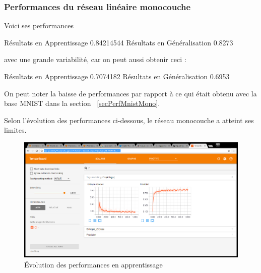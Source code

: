 \documentclass[a4paper,11pt]{book}
\begin{document}
\subsubsection{Performances du réseau linéaire monocouche}
\label{secPerfFMnistMono}

Voici ses performances
\begin{myoutput}
Résultats en Apprentissage 0.84214544
Résultats en Généralisation 0.8273
\end{myoutput}
avec une grande variabilité, car on peut aussi obtenir ceci :
\begin{myoutput}
Résultats en Apprentissage 0.7074182
Résultats en Généralisation 0.6953
\end{myoutput}

On peut noter la baisse de performances par rapport à ce qui était obtenu avec la base MNIST dans la section ~\ref{secPerfMnistMono}.

Selon l'évolution des performances ci-dessous, le réseau monocouche a atteint ses limites.

\begin{figure}[H]
\begin{center}
\includegraphics[width=15cm]{./figures/scalarFMnistMono.png} 
\end{center}
\caption{Évolution des performances en apprentissage}
\end{figure}
\end{document}
